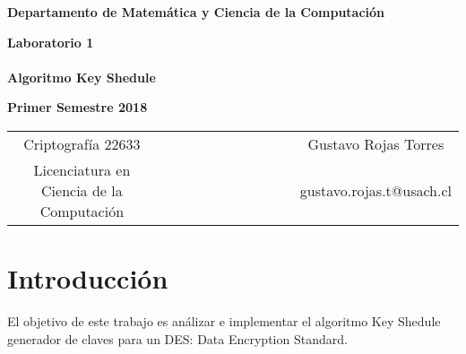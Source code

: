 \documentclass{report}
\begin{document}
\begin{titlepage}
\begin{center}
\end{center}
\begin{center}
{\bf Departamento de Matem\'atica y Ciencia de la Computaci\'on}
\end{center}
\vspace{3cm}
\begin{center}
%
%
{\Large \bf Laboratorio 1 \\
~~ \\
Algoritmo Key Shedule}
%
%
\end{center}
\begin{center}
%
%
%
{\large \bf Primer Semestre 2018}
%
%
\end{center}
\vspace{5cm}
\begin{tabular}{c l c}
%
%
%
Criptograf\'ia 22633 & ~~~~~~~~~~~~~~~~~ & Gustavo Rojas Torres \\
%
%
%
Licenciatura en Ciencia de la Computaci\'on & ~~ & gustavo.rojas.t@usach.cl 
%
%
\end{tabular}
\end{titlepage}
%
\section{Introducci\'on}
El objetivo de este trabajo es an\'alizar e implementar el algoritmo Key Shedule generador de claves para un DES: Data Encryption Standard.
%
\end{document}
